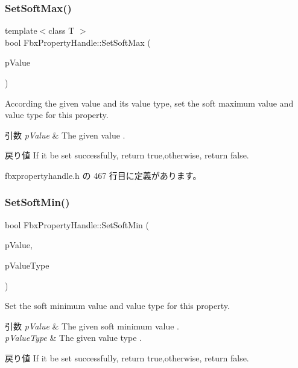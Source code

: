 \subsubsection{\texorpdfstring{Set\+Soft\+Max()}{SetSoftMax()}\hspace{0.1cm}{\footnotesize\ttfamily [2/2]}}
{\footnotesize\ttfamily template$<$class T $>$ \\
bool Fbx\+Property\+Handle\+::\+Set\+Soft\+Max (\begin{DoxyParamCaption}\item[{const T \&}]{p\+Value }\end{DoxyParamCaption})\hspace{0.3cm}{\ttfamily [inline]}}

According the given value and its value type, set the soft maximum value and value type for this property. 
\begin{DoxyParams}{引数}
{\em p\+Value} & The given value . \\
\hline
\end{DoxyParams}
\begin{DoxyReturn}{戻り値}
If it be set successfully, return true,otherwise, return false. 
\end{DoxyReturn}


 fbxpropertyhandle.\+h の 467 行目に定義があります。

\mbox{\label{class_fbx_property_handle_af70fa8b28c77e394928d4e1e7cabe50d}} 
\subsubsection{\texorpdfstring{Set\+Soft\+Min()}{SetSoftMin()}\hspace{0.1cm}{\footnotesize\ttfamily [1/2]}}
{\footnotesize\ttfamily bool Fbx\+Property\+Handle\+::\+Set\+Soft\+Min (\begin{DoxyParamCaption}\item[{const void $\ast$}]{p\+Value,  }\item[{\hyperlink{fbxpropertytypes_8h_a73913a5ddfb20e57c6f25e9e6784bd92}{E\+Fbx\+Type}}]{p\+Value\+Type }\end{DoxyParamCaption})}

Set the soft minimum value and value type for this property. 
\begin{DoxyParams}{引数}
{\em p\+Value} & The given soft minimum value . \\
\hline
{\em p\+Value\+Type} & The given value type . \\
\hline
\end{DoxyParams}
\begin{DoxyReturn}{戻り値}
If it be set successfully, return true,otherwise, return false. 
\end{DoxyReturn}
\mbox{\label{class_fbx_property_handle_a636d40ff360385c71587813842f6d004}} 
